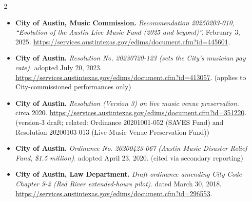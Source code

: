 {\begin{multicols}{2}
\begin{itemize}[itemsep=0pt,topsep=1pt,parsep=0pt,partopsep=0pt,leftmargin=1em]
\item \textbf{City of Austin, Music Commission.} \textit{Recommendation 20250203-010, “Evolution of the Austin Live Music Fund (2025 and beyond)”.} February 3, 2025. \url{https://services.austintexas.gov/edims/document.cfm?id=445601}.
\item \textbf{City of Austin.} \textit{Resolution No. 20230720-123 (sets the City’s musician pay rate).} adopted July 20, 2023. \url{https://services.austintexas.gov/edims/document.cfm?id=413057}. {\color{ammuted}(applies to City-commissioned performances only)}
\item \textbf{City of Austin.} \textit{Resolution (Version 3) on live music venue preservation.} circa 2020. \url{https://services.austintexas.gov/edims/document.cfm?id=351220}. {\color{ammuted}(version-3 draft; related: Ordinance 20201001-052 (SAVES Fund) and Resolution 20200103-013 (Live Music Venue Preservation Fund))}
\item \textbf{City of Austin.} \textit{Ordinance No. 20200423-067 (Austin Music Disaster Relief Fund, \$1.5 million).} adopted April 23, 2020. {\color{ammuted}(cited via secondary reporting)}
\item \textbf{City of Austin, Law Department.} \textit{Draft ordinance amending City Code Chapter 9-2 (Red River extended-hours pilot).} dated March 30, 2018. \url{https://services.austintexas.gov/edims/document.cfm?id=296553}.
\end{itemize}

\end{multicols}}
